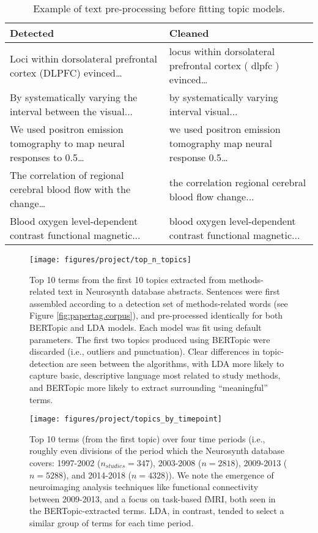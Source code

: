 \begin{table*}[]
	\centering
	\footnotesize
	\begin{tabular}{ll}
		\normalsize \textbf{Detected}                                                               												& \normalsize \textbf{Cleaned}                                                            \\ 
		\hline
		Loci within dorsolateral prefrontal cortex (DLPFC) evinced…                   					  & locus within dorsolateral prefrontal cortex ( dlpfc ) evinced…              \\
		By systematically varying the interval between the visual...										  & by systematically varying interval visual...         \\
		We used positron emission tomography to map neural responses to 0.5…            	& we used positron emission tomography map neural response 0.5…               \\
		The correlation of regional cerebral blood flow with the change…                			  & the correlation regional cerebral blood flow change...                       \\
		Blood oxygen level-dependent contrast functional magnetic...								 & blood oxygen level-dependent contrast functional magnetic... \\
		\hline
	\end{tabular}
	\caption{Example of text pre-processing before fitting topic models.}
	\label{tab:cleaned}
\end{table*}

\begin{figure*}[tp!]
	\texttt{[image: figures/project/top\_n\_topics]}
	\caption{Top 10 terms from the first 10 topics extracted from methods-related text in Neurosynth database abstracts. Sentences were first assembled according to a detection set of methods-related words (see Figure \ref{fig:papertag.corpus}), and pre-processed identically for both BERTopic and LDA models. Each model was fit using default parameters. The first two topics produced using BERTopic were discarded (i.e., outliers and punctuation). Clear differences in topic-detection are seen between the algorithms, with LDA more likely to capture basic, descriptive language most related to study methods, and BERTopic more likely to extract surrounding ``meaningful'' terms.}
	\label{fig:papertag.topterms}
\end{figure*}


\begin{figure*}[]
	\texttt{[image: figures/project/topics\_by\_timepoint]}
	\caption{Top 10 terms (from the first topic) over four time periods (i.e., roughly even divisions of the period which the Neurosynth database covers: 1997-2002 ($n_{studies}=347$), 2003-2008 ($n=2818$), 2009-2013 ($n=5288$), and 2014-2018 ($n=4328$)). We note the emergence of neuroimaging analysis techniques like functional connectivity between 2009-2013, and a focus on task-based fMRI, both seen in the BERTopic-extracted terms. LDA, in contrast, tended to select a similar group of terms for each time period.}
	\label{fig:papertag.termsovertime}
\end{figure*}




